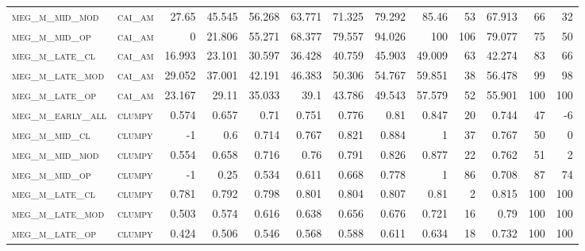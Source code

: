 \begin{landscape}
\begin{center}
\begin{footnotesize}
\begin{longtable}{llrrrrrrrr|rrr}
\textsc{meg\_m\_mid\_mod  } & \textsc{cai\_am   }   & 27.65    & 45.545   & 56.268   & 63.771   & 71.325   & 79.292   & 85.46     & 53     & 67.913        & 66            & 32              \\
\textsc{meg\_m\_mid\_op   } & \textsc{cai\_am   }   & 0        & 21.806   & 55.271   & 68.377   & 79.557   & 94.026   & 100       & 106    & 79.077        & 75            & 50              \\
\textsc{meg\_m\_late\_cl  } & \textsc{cai\_am   }   & 16.993   & 23.101   & 30.597   & 36.428   & 40.759   & 45.903   & 49.009    & 63     & 42.274        & 83            & 66              \\
\textsc{meg\_m\_late\_mod } & \textsc{cai\_am   }   & 29.052   & 37.001   & 42.191   & 46.383   & 50.306   & 54.767   & 59.851    & 38     & 56.478        & 99            & 98              \\
\textsc{meg\_m\_late\_op  } & \textsc{cai\_am   }   & 23.167   & 29.11    & 35.033   & 39.1     & 43.786   & 49.543   & 57.579    & 52     & 55.901        & 100           & 100             \\
\textsc{meg\_m\_early\_all} & \textsc{clumpy    }   & 0.574    & 0.657    & 0.71     & 0.751    & 0.776    & 0.81     & 0.847     & 20     & 0.744         & 47            & -6              \\
\textsc{meg\_m\_mid\_cl   } & \textsc{clumpy    }   & -1       & 0.6      & 0.714    & 0.767    & 0.821    & 0.884    & 1         & 37     & 0.767         & 50            & 0               \\
\textsc{meg\_m\_mid\_mod  } & \textsc{clumpy    }   & 0.554    & 0.658    & 0.716    & 0.76     & 0.791    & 0.826    & 0.877     & 22     & 0.762         & 51            & 2               \\
\textsc{meg\_m\_mid\_op   } & \textsc{clumpy    }   & -1       & 0.25     & 0.534    & 0.611    & 0.668    & 0.778    & 1         & 86     & 0.708         & 87            & 74              \\
\textsc{meg\_m\_late\_cl  } & \textsc{clumpy    }   & 0.781    & 0.792    & 0.798    & 0.801    & 0.804    & 0.807    & 0.81      & 2      & 0.815         & 100           & 100             \\
\textsc{meg\_m\_late\_mod } & \textsc{clumpy    }   & 0.503    & 0.574    & 0.616    & 0.638    & 0.656    & 0.676    & 0.721     & 16     & 0.79          & 100           & 100             \\
\textsc{meg\_m\_late\_op  } & \textsc{clumpy    }   & 0.424    & 0.506    & 0.546    & 0.568    & 0.588    & 0.611    & 0.634     & 18     & 0.732         & 100           & 100             \\

\end{longtable}
\end{footnotesize}
\end{center}
\end{landscape}
